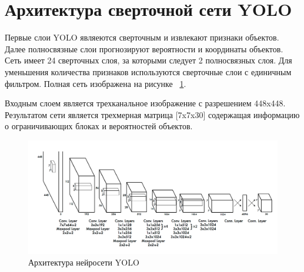 \documentclass[a4paper,english,russian]{G2-105}
\begin{document}
\section{Архитектура сверточной сети YOLO} \ttl
\par Первые слои YOLO являеются сверточным и извлекают признаки объектов. Далее полносвязные слои прогнозируют вероятности и координаты объектов. Сеть имеет 24 сверточных слоя, за которыми следует 2 полносвязных слоя. Для уменьшения количества признаков используются сверточные слои с единичным фильтром. Полная сеть изображена на рисунке ~\ref{yolonet}.
\par Входным слоем является трехканальное изображение с разрешением 448x448. Результатом сети является трехмерная матрица [7x7x30] содержащая информацию о ограничивающих блоках и вероятностей объектов.
\begin{figure}
	\begin{center}
    		\includegraphics[width=\linewidth]{yolonet.png}
    		\caption{Архитектура нейросети YOLO}
		\label{yolonet}
	\end{center}
\end{figure}
\ttl
\end{document}
